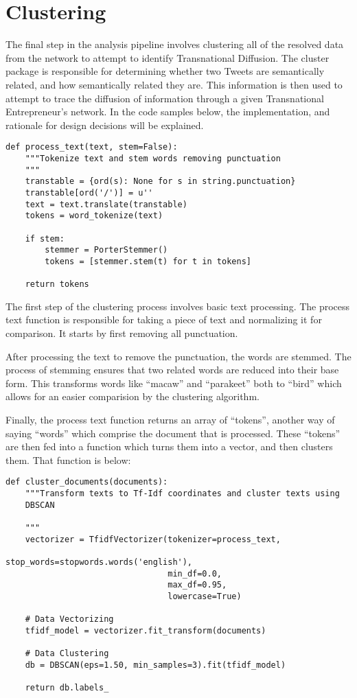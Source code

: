\section{Clustering}
The final step in the analysis pipeline involves clustering all of the
resolved data from the network to attempt to identify Transnational
Diffusion. The cluster package is responsible for determining whether
two Tweets are semantically related, and how semantically related they
are. This information is then used to attempt to trace the diffusion
of information through a given Transnational Entrepreneur's
network. In the code samples below, the implementation, and rationale
for design decisions will be explained.

\begin{lstlisting}
def process_text(text, stem=False):
    """Tokenize text and stem words removing punctuation
    """
    transtable = {ord(s): None for s in string.punctuation}
    transtable[ord('/')] = u''
    text = text.translate(transtable)
    tokens = word_tokenize(text)
    
    if stem:
        stemmer = PorterStemmer()
        tokens = [stemmer.stem(t) for t in tokens]
    
    return tokens
\end{lstlisting}

The first step of the clustering process involves basic text
processing.  The process text function is responsible for taking a
piece of text and normalizing it for comparison. It starts by first
removing all punctuation.

After processing the text to remove the punctuation, the words are
stemmed. The process of stemming ensures that two related words are
reduced into their base form. This transforms words like ``macaw'' and
``parakeet'' both to ``bird'' which allows for an easier comparision
by the clustering algorithm.

Finally, the process text function returns an array of ``tokens'',
another way of saying ``words'' which comprise the document that is
processed. These ``tokens'' are then fed into a function which turns
them into a vector, and then clusters them. That function is below:
  
\begin{lstlisting}
def cluster_documents(documents):
    """Transform texts to Tf-Idf coordinates and cluster texts using
    DBSCAN
    
    """
    vectorizer = TfidfVectorizer(tokenizer=process_text,
                                 stop_words=stopwords.words('english'),
                                 min_df=0.0,
                                 max_df=0.95,
                                 lowercase=True)
    
    # Data Vectorizing
    tfidf_model = vectorizer.fit_transform(documents)
    
    # Data Clustering
    db = DBSCAN(eps=1.50, min_samples=3).fit(tfidf_model)
    
    return db.labels_
\end{lstlisting}


